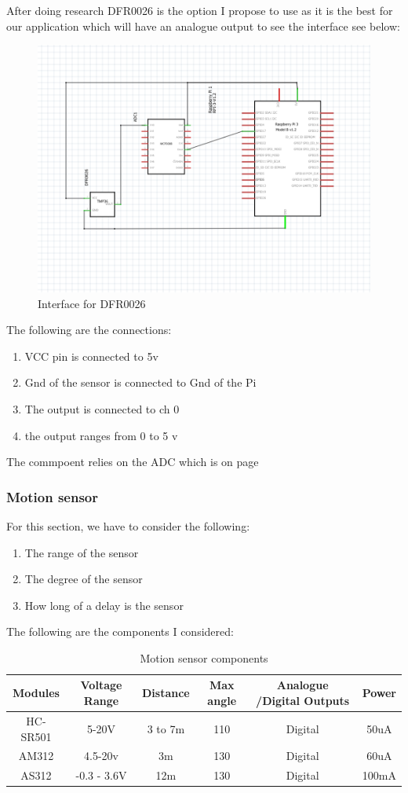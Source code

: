 \newpage
After doing research DFR0026 \cite{DFR0026} is the option I propose to use as it is the best for our application  which will have an analogue  output to see the interface see below:

\begin{figure}[h!]
	\centering
	\includegraphics[width=0.6\linewidth]{Images/InterfaceofDFR0026.png}
	\caption{Interface for  DFR0026}
	\label{Interface for  DFR0026}
\end{figure}

The following are  the connections:
\begin{enumerate}
	\item VCC pin is connected  to 5v
	\item Gnd of the  sensor is connected to Gnd of the Pi
	\item The output is connected to  ch 0
	\item the output ranges  from  0 to  5 v
\end{enumerate}
The commpoent relies on the  ADC  which  is on page\pageref{Adc section}
\subsubsection{Motion sensor}

For this section, we have  to consider the following:
\begin{enumerate}
	\item The range of the  sensor
	\item The degree of the  sensor
	\item How long of a  delay is the sensor
\end{enumerate}
The  following are  the components I considered:
\begin{table}[h!]
	\centering
	\begin{tabular}{|c|c|c|c|c|c|}
		\hline
		Modules & Voltage Range & Distance & Max angle & Analogue /Digital Outputs & Power \\
		\hline
		HC-SR501 & 5-20V & 3 to 7m & 110 & Digital & 50uA \\
		AM312 & 4.5-20v & 3m & 130 & Digital & 60uA \\
		AS312 & -0.3 - 3.6V & 12m & 130 & Digital & 100mA \\
		\hline
	\end{tabular}
	\caption{Motion sensor components}
	\label{Motion sensor components}
\end{table}

